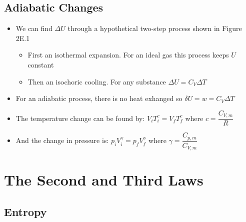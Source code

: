 \documentclass[12pt, openany, letterpaper]{memoir}
\begin{document}
\section{Adiabatic Changes}
\begin{itemize}
	\item We can find $\Delta U$ through a hypothetical two-step process shown in Figure 2E.1
	      \begin{itemize}
		      \item First an isothermal expansion. For an ideal gas this process keeps $U$ constant
		      \item Then an isochoric cooling. For any substance $\Delta U = C_V\Delta T$
	      \end{itemize}
	\item For an adiabatic process, there is no heat exhanged so $\delta U = w = C_V\Delta T$
	\item The temperature change can be found by: $V_iT_i^c = V_fT_f^c$ where $c=\dfrac{C_{V,m}}{R}$
	\item And the change in pressure is: $p_iV_i^\gamma=p_fV_f^\gamma$ where $\gamma = \dfrac{C_{p,m}}{C_{V,m}}$
\end{itemize}

\chapter{The Second and Third Laws}
\section{Entropy}
\end{document}
